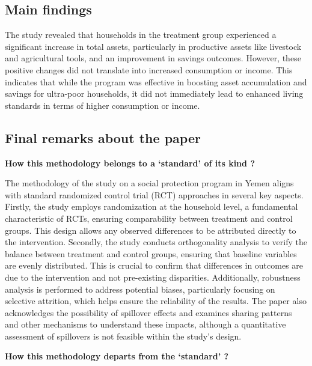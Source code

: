 \documentclass{article}
\begin{document}
\subsection{Main findings} 

The study revealed that households in the treatment group experienced a significant increase in total assets, particularly in productive assets like livestock and agricultural tools, and an improvement in savings outcomes. However, these positive changes did not translate into increased consumption or income. This indicates that while the program was effective in boosting asset accumulation and savings for ultra-poor households, it did not immediately lead to enhanced living standards in terms of higher consumption or income.

\subsection{Final remarks about the paper} 
 
\textbf{How this methodology belongs to a ‘standard’ of its kind ?} \newline

The methodology of the study on a social protection program in Yemen aligns with standard randomized control trial (RCT) approaches in several key aspects. Firstly, the study employs randomization at the household level, a fundamental characteristic of RCTs, ensuring comparability between treatment and control groups. This design allows any observed differences to be attributed directly to the intervention. Secondly, the study conducts orthogonality analysis to verify the balance between treatment and control groups, ensuring that baseline variables are evenly distributed. This is crucial to confirm that differences in outcomes are due to the intervention and not pre-existing disparities. Additionally, robustness analysis is performed to address potential biases, particularly focusing on selective attrition, which helps ensure the reliability of the results. The paper also acknowledges the possibility of spillover effects and examines sharing patterns and other mechanisms to understand these impacts, although a quantitative assessment of spillovers is not feasible within the study's design. \newline

\textbf{How this methodology departs from the ‘standard’ ?} \newline
\end{document}
